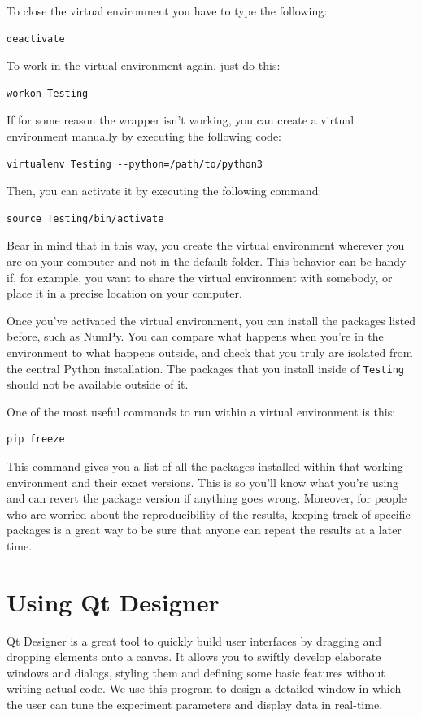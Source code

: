 To close the virtual environment you have to type the following:

\begin{verbatim}
deactivate
\end{verbatim}

To work in the virtual environment again, just do this:
\begin{verbatim}
workon Testing
\end{verbatim}

If for some reason the wrapper isn't working, you can create a virtual environment manually by executing the following code:
\begin{verbatim}
virtualenv Testing --python=/path/to/python3
\end{verbatim}
Then, you can activate it by executing the following command:
\begin{verbatim}
source Testing/bin/activate
\end{verbatim}

Bear in mind that in this way, you create the virtual environment wherever you are on your computer and not in the default folder. This behavior can be handy if, for example, you want to share the virtual environment with somebody, or place it in a precise location on your computer.

Once you've activated the virtual environment, you can install the packages listed before, such as NumPy. You can compare what happens when you're in the environment to what happens outside, and check that you truly are isolated from the central Python installation. The packages that you install inside of \texttt{Testing} should not be available outside of it.

One of the most useful commands to run within a virtual environment is this:

\begin{verbatim}
pip freeze
\end{verbatim}

This command gives you a list of all the packages installed within that working environment and their exact versions. This is so you'll know what you're using and can revert the package version if anything goes wrong. Moreover, for people who are worried about the reproducibility of the results, keeping track of specific packages is a great way to be sure that anyone can repeat the results at a later time.

\section{Using Qt Designer}\label{sec:install-qt-designer}
Qt Designer is a great tool to quickly build user interfaces by dragging and dropping elements onto a canvas. It allows you to swiftly develop elaborate windows and dialogs, styling them and defining some basic features without writing actual code. We use this program to design a detailed window in which the user can tune the experiment parameters and display data in real-time.


